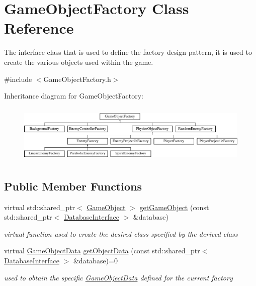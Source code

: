 \hypertarget{class_game_object_factory}{}\section{Game\+Object\+Factory Class Reference}
\label{class_game_object_factory}


The interface class that is used to define the factory design pattern, it is used to create the various objects used within the game.  




{\ttfamily \#include $<$Game\+Object\+Factory.\+h$>$}

Inheritance diagram for Game\+Object\+Factory\+:\begin{figure}[H]
\begin{center}
\leavevmode
\includegraphics[height=2.835443cm]{d6/d7c/class_game_object_factory}
\end{center}
\end{figure}
\subsection*{Public Member Functions}
\begin{DoxyCompactItemize}
\item 
virtual std\+::shared\+\_\+ptr$<$ \hyperlink{class_game_object}{Game\+Object} $>$ \hyperlink{class_game_object_factory_a5b684a6e77fb82c041f1721eb07c553d}{get\+Game\+Object} (const std\+::shared\+\_\+ptr$<$ \hyperlink{class_database_interface}{Database\+Interface} $>$ \&database)
\begin{DoxyCompactList}\small\item\em virtual function used to create the desired class specified by the derived class \end{DoxyCompactList}\item 
virtual \hyperlink{struct_game_object_data}{Game\+Object\+Data} \hyperlink{class_game_object_factory_ae9358fbb3ef2d3b127320341760d3ff9}{get\+Object\+Data} (const std\+::shared\+\_\+ptr$<$ \hyperlink{class_database_interface}{Database\+Interface} $>$ \&database)=0
\begin{DoxyCompactList}\small\item\em used to obtain the specific \hyperlink{struct_game_object_data}{Game\+Object\+Data} defined for the current factory \end{DoxyCompactList}\end{DoxyCompactItemize}


